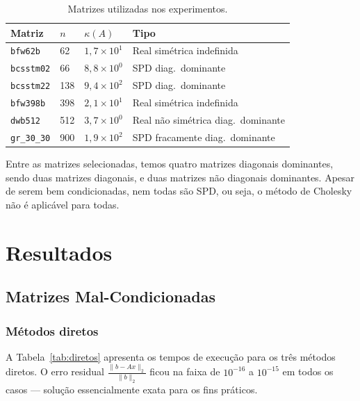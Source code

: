 \documentclass[12pt, a4paper]{article}
\begin{document}
\begin{table}[H]
  \centering
  \caption{Matrizes utilizadas nos experimentos.}
  \label{tab:matrizes2}
  \renewcommand{\arraystretch}{1.3}
  \begin{tabular}{llll}
    \toprule
    \textbf{Matriz} & \textbf{$n$} & \textbf{$\kappa(A)$} & \textbf{Tipo} \\
    \midrule
    \texttt{bfw62b} & 62   & $1{,}7 \times 10^1$ & Real simétrica indefinida \\
    \texttt{bcsstm02} & 66  & $8{,}8 \times 10^0$ & SPD diag.\ dominante \\
    \texttt{bcsstm22} & 138  & $9{,}4 \times 10^2$ & SPD diag.\ dominante \\
    \texttt{bfw398b} & 398  & $2{,}1 \times 10^1$ & Real simétrica indefinida \\
    \texttt{dwb512}     & 512  & $3{,}7 \times 10^0$ & Real não simétrica diag.\ dominante \\
    \texttt{gr\_30\_30}& 900 & $1{,}9 \times 10^2$ & SPD fracamente diag.\ dominante \\
    \bottomrule
  \end{tabular}
\end{table}
 
Entre as matrizes selecionadas, temos quatro matrizes diagonais dominantes, sendo duas matrizes diagonais, e duas matrizes não diagonais dominantes. Apesar de serem bem condicionadas, nem todas são SPD, ou seja, o método de Cholesky não é aplicável para todas.

\section{Resultados}

\subsection{Matrizes Mal-Condicionadas}
 
\subsubsection{Métodos diretos}
 
A Tabela~\ref{tab:diretos} apresenta os tempos de execução para os três métodos diretos.
O erro residual $\frac{\|b - Ax\|_2}{\|b\|_2}$ ficou na faixa de $10^{-16}$ a $10^{-15}$ em todos os
casos — solução essencialmente exata para os fins práticos.
 
\end{document}
